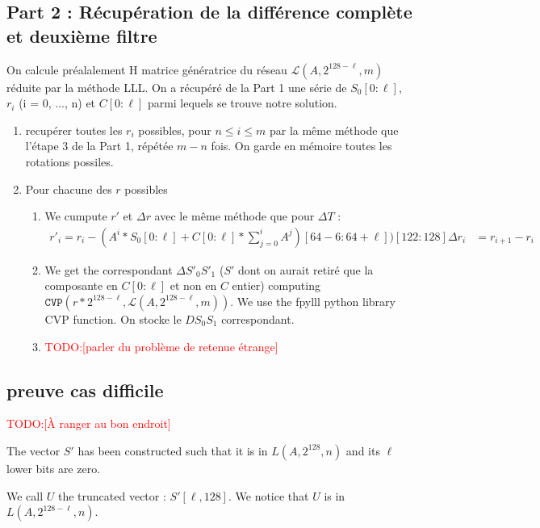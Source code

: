 \documentclass[preprint,svgnames]{iacrtrans}
\newcommand{\todo}[1]{\textcolor{red}{TODO:[#1]}}
\begin{document}
\subsection{Part 2 : Récupération de la différence complète et deuxième filtre}
On calcule préalalement H matrice génératrice du réseau $\mathcal{L}(A,2^{128 - \ell},m)$ réduite par la méthode LLL.
On a récupéré de la Part 1 une série de $S_0[0 : \ell]$, $r_i$ (i = 0, ..., n) et $C[0 : \ell]$ parmi lequels se trouve notre solution.
\begin{enumerate}
  \item recupérer toutes les $r_i$ possibles, pour $n \leq i \leq m$  par la même méthode que l'étape 3 de la Part 1, répétée $m-n$ fois. On garde en mémoire toutes les rotations possiles.
  \item Pour chacune des $r$ possibles
  \begin{enumerate}
    \item We cumpute $r'$ et $\Delta r$ avec le même méthode que pour $\Delta T$ : 
    \begin{align}
      r'_i = r_i - (A^i*S_0[0 : \ell] + C[0 : \ell] * \sum_{j = 0}^i A^j)[64 - 6 : 64 + \ell])[122 : 128]
      \Delta r_i &= r_{i+1} - r_i
    \end{align}

    \item We get the correspondant $\Delta S'_0S'_1$ ($S'$ dont on aurait retiré que la composante en $C[0 : \ell]$ et non en $C$ entier) computing $\texttt{CVP}(r * 2^{128 - \ell}, \mathcal{L}(A,2^{128 - \ell},m))$. We use the fpylll python library CVP function. On stocke le $DS_0S_1$ correspondant.

    \item \todo{parler du problème de retenue étrange}
    
  \end{enumerate}
\end{enumerate}

\subsection{preuve cas difficile}
\todo{À ranger au bon endroit}

The vector \(S'\) has been constructed such that it is in \(L(A,2^{128},n)\) and its \(\ell\) lower bits are zero.

We call \(U\) the truncated vector : \(S'[\ell,128]\). We notice that \(U\) is in \(L(A,2^{128-\ell},n)\).
\end{document}
